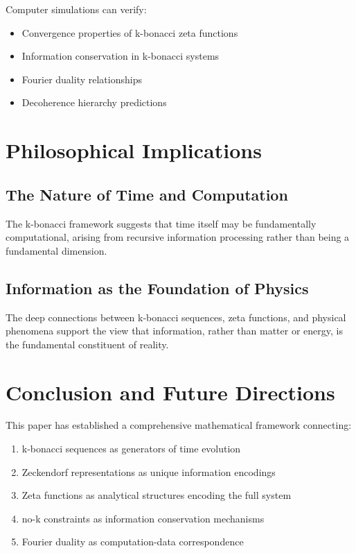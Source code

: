 \documentclass[12pt]{article}
\theoremstyle{plain}
\theoremstyle{definition}
\begin{document}
Computer simulations can verify:
\begin{itemize}
\item Convergence properties of k-bonacci zeta functions
\item Information conservation in k-bonacci systems
\item Fourier duality relationships
\item Decoherence hierarchy predictions
\end{itemize}

\section{Philosophical Implications}

\subsection{The Nature of Time and Computation}

The k-bonacci framework suggests that time itself may be fundamentally computational, arising from recursive information processing rather than being a fundamental dimension.

\subsection{Information as the Foundation of Physics}

The deep connections between k-bonacci sequences, zeta functions, and physical phenomena support the view that information, rather than matter or energy, is the fundamental constituent of reality.

\section{Conclusion and Future Directions}

This paper has established a comprehensive mathematical framework connecting:

\begin{enumerate}
\item k-bonacci sequences as generators of time evolution
\item Zeckendorf representations as unique information encodings
\item Zeta functions as analytical structures encoding the full system
\item no-k constraints as information conservation mechanisms
\item Fourier duality as computation-data correspondence
\end{enumerate}
\end{document}
